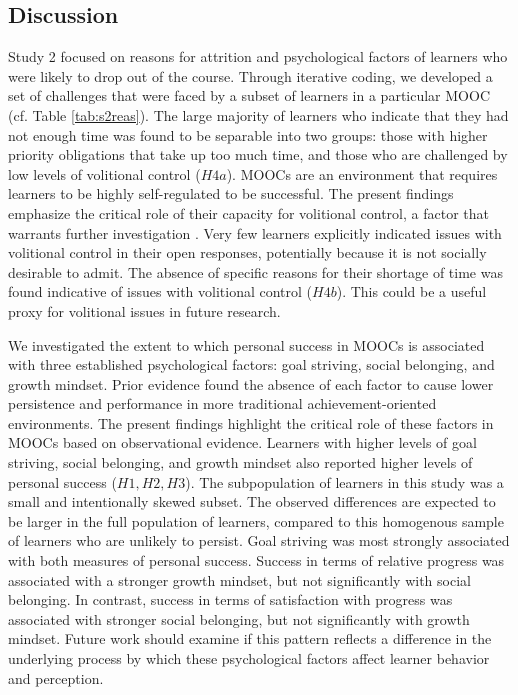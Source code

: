 \documentclass{sigchi}\usepackage[]{graphicx}\usepackage[]{color}
\begin{document}
\subsection{Discussion}

Study 2 focused on reasons for attrition and psychological factors of learners who were likely to drop out of the course. Through iterative coding, we developed a set of challenges that were faced by a subset of learners in a particular MOOC (cf. Table \ref{tab:s2reas}). The large majority of learners who indicate that they had not enough time was found to be separable into two groups: those with higher priority obligations that take up too much time, and those who are challenged by low levels of volitional control ($H4a$). MOOCs are an environment that requires learners to be highly self-regulated to be successful. The present findings emphasize the critical role of their capacity for volitional control, a factor that warrants further investigation \cite{corno2001volitional}. Very few learners explicitly indicated issues with volitional control in their open responses, potentially because it is not socially desirable to admit. The absence of specific reasons for their shortage of time was found indicative of issues with volitional control ($H4b$). This could be a useful proxy for volitional issues in future research.

We investigated the extent to which personal success in MOOCs is associated with three established psychological factors: goal striving, social belonging, and growth mindset. Prior evidence found the absence of each factor to cause lower persistence and performance in more traditional achievement-oriented environments. The present findings highlight the critical role of these factors in MOOCs based on observational evidence. Learners with higher levels of goal striving, social belonging, and growth mindset also reported higher levels of personal success ($H1,H2,H3$). The subpopulation of learners in this study was a small and intentionally skewed subset. The observed differences are expected to be larger in the full population of learners, compared to this homogenous sample of learners who are unlikely to persist. Goal striving was most strongly associated with both measures of personal success. Success in terms of relative progress was associated with a stronger growth mindset, but not significantly with social belonging. In contrast, success in terms of satisfaction with progress was associated with stronger social belonging, but not significantly with growth mindset. Future work should examine if this pattern reflects a difference in the underlying process by which these psychological factors affect learner behavior and perception.
\end{document}
